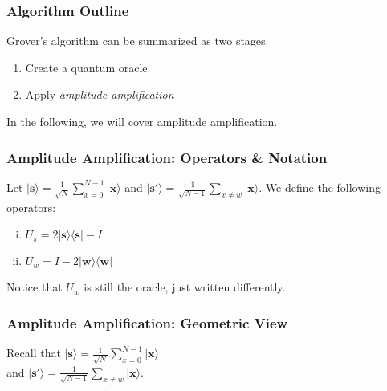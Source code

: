 \documentclass{beamer}
\begin{document}
\begin{frame}
  \frametitle{Algorithm Outline}
  Grover's algorithm can be summarized as two stages.
  \begin{enumerate}
    \item Create a quantum oracle.
    \item Apply \textit{amplitude amplification}
  \end{enumerate}
  In the following, we will cover amplitude amplification.
\end{frame}


\begin{frame}
  \frametitle{Amplitude Amplification: Operators \& Notation}
  Let $\boldsymbol{|s\rangle}=\frac{1}{\sqrt{N}} \sum_{x = 0}^{N -1} | \boldsymbol{x} \rangle$ 
  and  $\boldsymbol{|s'\rangle}=\frac{1}{\sqrt{N-1}} \sum_{x \neq w} | \boldsymbol{x} \rangle$.
  We define the following operators:

  \begin{enumerate}[(i)]
    \item  $U_s=2|\boldsymbol s\rangle\langle \boldsymbol s| - I$
    \item  $U_w=I-2|\boldsymbol w\rangle\langle \boldsymbol w|$ 
  \end{enumerate}
  Notice that $U_w$ is still the oracle, just written differently.
\end{frame}


\begin{frame}
  \frametitle{Amplitude Amplification: Geometric View}
  \hspace*{\fill}  Recall that $\boldsymbol{|s\rangle}=\frac{1}{\sqrt{N}} \sum_{x = 0}^{N -1} | \boldsymbol{x} \rangle$ \\
  \hspace*{\fill}  and $\boldsymbol{|s'\rangle}=\frac{1}{\sqrt{N-1}} \sum_{x \neq w} | \boldsymbol{x} \rangle$.
  



\end{frame}
\end{document}
